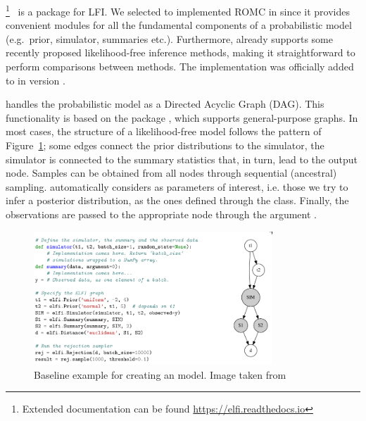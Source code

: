 \footnote{Extended
  documentation can be found
  \href{https://elfi.readthedocs.io/en/latest/}{https://elfi.readthedocs.io}}~\cite{1708.00707}
is a  package for LFI. We
selected to implemented ROMC in  since it provides
convenient modules for all the fundamental components of a
probabilistic model (e.g.\ prior, simulator, summaries
etc.). Furthermore,  already supports some recently proposed
likelihood-free inference methods, making it straightforward to
perform comparisons between methods. The implementation was officially
added to  in version .


 handles the probabilistic model as a Directed Acyclic Graph
(DAG). This functionality is based on the package ,
which supports general-purpose graphs. In most cases, the structure of
a likelihood-free model follows the pattern of Figure~\ref{fig:elfi};
some edges connect the prior distributions to the simulator, the
simulator is connected to the summary statistics that, in turn, lead
to the output node. Samples can be obtained from all nodes through
sequential (ancestral) sampling.  automatically considers as
parameters of interest, i.e. those we try to infer a posterior
distribution, as the ones defined through the 
class. Finally, the observations are passed to the appropriate node
through the argument
.

\begin{figure}[ht]
    \begin{center}
      \includegraphics[width=0.8\textwidth]{./latex_files/images/chapter2/elfi.png}
    \end{center}
    \caption[Baseline example for creating an  model]{Baseline example for creating an  model. Image taken from \cite{1708.00707}}
    \label{fig:elfi}
\end{figure}

